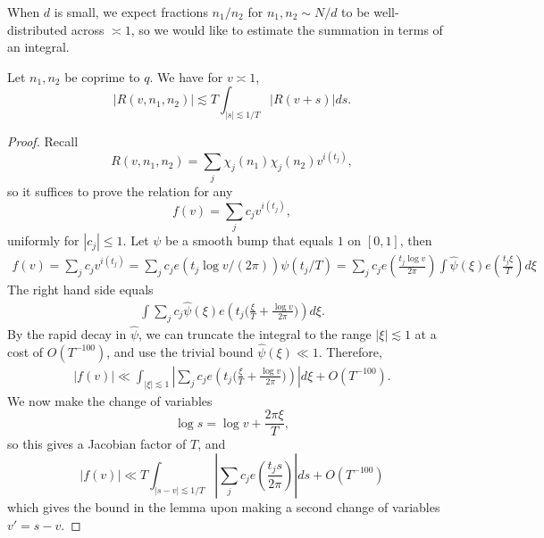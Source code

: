 When $d$ is small, we expect fractions $n_1/n_2$ for $n_1,n_2\sim N/d$ to be well-distributed across $\asymp 1$, so we would like to estimate the summation in terms of an integral. 
\begin{lemma}
    Let $n_1,n_2$ be coprime to $q$. We have for $v\asymp 1$,
    \[
    |R(v,n_1,n_2)|\lesssim T\int_{|s|\lesssim 1/T} |R(v+s)|ds.
    \]
\end{lemma}
\begin{proof}
    Recall \[
    R(v,n_1,n_2)=\sum_j \chi_j(n_1)\chi_j(n_2)v^{i(t_j)},
    \]
    so it suffices to prove the relation for any \[
    f(v) = \sum_j c_j v^{i(t_j)},
    \]
    uniformly for $|c_j|\leq 1$. Let $\psi$ be a smooth bump that equals $1$ on $[0,1]$, then \begin{align*}
        f(v) = \sum_j c_j v^{i(t_j)} = \sum_j c_j e(t_j\log v/(2\pi))\psi(t_j/T) =  \sum_j c_j e\left(\frac{t_j\log v}{2\pi}\right)\int \hat\psi(\xi)e\left(\frac{t_j\xi}{T}\right)d\xi
    \end{align*}
    The right hand side equals \begin{align*}
        \int \sum_j c_j  \hat\psi(\xi)e\left(t_j\Big(\frac{\xi}{T} +\frac{\log v}{2\pi}\Big)\right)d\xi.
    \end{align*}
    By the rapid decay in $\hat\psi$, we can truncate the integral to the range $|\xi|\lesssim 1$ at a cost of $O(T^{-100})$, and use the trivial bound $\hat\psi(\xi)\ll 1$.
    Therefore, \begin{align*}
        |f(v)|\ll \int_{|\xi|\lesssim 1}\left| \sum_j c_j  e\left(t_j\Big(\frac{\xi}{T} +\frac{\log v}{2\pi}\Big)\right)\right|d\xi +O(T^{-100}).
    \end{align*}
    We now make the change of variables \[
    \log s= \log v + \frac{2\pi\xi}{T},
    \]
    so this gives a Jacobian factor of $T$, and \[
        |f(v)|\ll T \int_{|s-v|\lesssim 1/T}\left| \sum_j c_j  e\left(\frac{t_js}{2\pi}\right)\right|ds +O(T^{-100})\]
        which gives the bound in the lemma upon making a second change of variables $v'=s-v$.
\end{proof}

